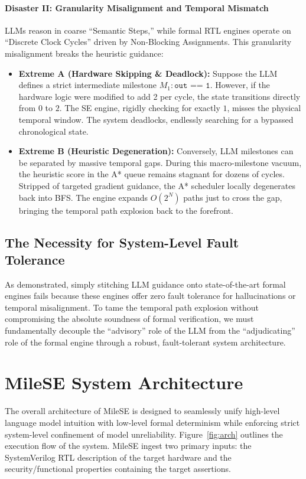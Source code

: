 \documentclass[conference]{IEEEtran}
\begin{document}
\paragraph{Disaster II: Granularity Misalignment and Temporal Mismatch}
LLMs reason in coarse ``Semantic Steps,'' while formal RTL engines operate on ``Discrete Clock Cycles'' driven by Non-Blocking Assignments. This granularity misalignment breaks the heuristic guidance:
\begin{itemize}
    \item \textbf{Extreme A (Hardware Skipping \& Deadlock):} Suppose the LLM defines a strict intermediate milestone $M_1: \texttt{out == 1}$. However, if the hardware logic were modified to add 2 per cycle, the state transitions directly from $0$ to $2$. The SE engine, rigidly checking for exactly $1$, misses the physical temporal window. The system deadlocks, endlessly searching for a bypassed chronological state.
    \item \textbf{Extreme B (Heuristic Degeneration):} Conversely, LLM milestones can be separated by massive temporal gaps. During this macro-milestone vacuum, the heuristic score in the A* queue remains stagnant for dozens of cycles. Stripped of targeted gradient guidance, the A* scheduler locally degenerates back into BFS. The engine expands $O(2^N)$ paths just to cross the gap, bringing the temporal path explosion back to the forefront.
\end{itemize}

\subsection{The Necessity for System-Level Fault Tolerance}
As demonstrated, simply stitching LLM guidance onto state-of-the-art formal engines fails because these engines offer zero fault tolerance for hallucinations or temporal misalignment. To tame the temporal path explosion without compromising the absolute soundness of formal verification, we must fundamentally decouple the ``advisory'' role of the LLM from the ``adjudicating'' role of the formal engine through a robust, fault-tolerant system architecture.

\section{MileSE System Architecture}
\label{sec:architecture}
The overall architecture of MileSE is designed to seamlessly unify high-level language model intuition with low-level formal determinism while enforcing strict system-level confinement of model unreliability. Figure~\ref{fig:arch} outlines the execution flow of the system. MileSE ingest two primary inputs: the SystemVerilog RTL description of the target hardware and the security/functional properties containing the target assertions.
\end{document}
